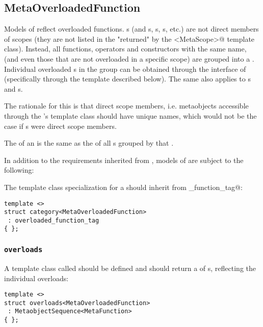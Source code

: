 \subsection{MetaOverloadedFunction}
\label{concept-MetaOverloadedFunction}

Models of  reflect overloaded functions.
s (and s, s, s, etc.)
are not direct members of scopes (they are not listed in the 
"returned" by the \verb@members<MetaScope>@ template class).
Instead, all functions, operators and constructors with the same name, (and even those that are not
overloaded in a specific scope) are grouped into a . Individual overloaded s
in the group can be obtained through the interface of  (specifically through the
\verb@overloads@ template described below). The same also applies to s and s.

The rationale for this is that direct scope members, i.e. metaobjects accessible through the 's
\verb@members@ template class should have unique names, which would not be the case if s
were direct scope members.

The \verb@scope@ of an  is the same as the \verb@scope@
of all s grouped by that .

In addition to the requirements inherited from ,
models of  are subject to the following:

The \verb@category@ template class specialization for a 
should inherit from \verb@overloaded_function_tag@:

\begin{verbatim}
template <>
struct category<MetaOverloadedFunction>
 : overloaded_function_tag
{ };
\end{verbatim}

\subsubsection{\texttt{overloads}}

A template class called \verb@overloads@ should be defined and should
return a  of s, reflecting
the individual overloads:

\begin{verbatim}
template <>
struct overloads<MetaOverloadedFunction>
 : MetaobjectSequence<MetaFunction>
{ };
\end{verbatim}

